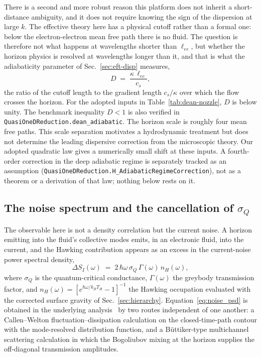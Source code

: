 \documentclass[aps,prd,reprint,nofootinbib,superscriptaddress]{revtex4-2}
\begin{document}
There is a second and more robust reason this platform does not inherit a
short-distance ambiguity, and it does not require knowing the sign of the
dispersion at large $k$. The effective theory here has a physical cutoff
rather than a formal one: below the electron-electron mean free path
there is no fluid. The question is therefore not what happens at
wavelengths shorter than $\ell_{ee}$, but whether the horizon physics is
resolved at wavelengths longer than it, and that is what the adiabaticity
parameter of Sec.~\ref{sec:eft-disp} measures,
\begin{equation}
D \;=\; \frac{\kappa\,\ell_{ee}}{c_s},
\label{eq:adiabaticity}
\end{equation}
the ratio of the cutoff length to the gradient length $c_s/\kappa$ over
which the flow crosses the horizon. For the adopted inputs in Table~\ref{tab:dean-nozzle}, $D$ is below
unity. The benchmark inequality $D < 1$ is also verified in
\texttt{QuasiOneDReduction.dean\_adiabatic}. The horizon scale is roughly four mean free paths. This scale separation
motivates a hydrodynamic treatment but does not determine the leading
dispersive correction from the microscopic theory. Our adopted quadratic
law gives a numerically small shift at these inputs. A fourth-order
correction in the deep adiabatic regime is separately tracked as an
assumption (\texttt{QuasiOneDReduction.H\_AdiabaticRegimeCorrection}),
not as a theorem or a derivation of that law; nothing below rests on it.

\subsection{The noise spectrum and the cancellation of $\sigma_Q$}
\label{sec:gr-noise}

The observable here is not a density correlation but the current noise. A
horizon emitting into the fluid's collective modes emits, in an
electronic fluid, into the current, and the Hawking contribution appears
as an excess in the current-noise power spectral density,
\begin{equation}
\Delta S_I(\omega) \;=\; 2\,\hbar\omega\,\sigma_Q\,\Gamma(\omega)\,
n_H(\omega),
\label{eq:noise_psd}
\end{equation}
where $\sigma_Q$ is the quantum-critical conductance, $\Gamma(\omega)$
the greybody transmission factor, and
$n_H(\omega) = [e^{\hbar\omega/k_B T_H} - 1]^{-1}$ the Hawking
occupation evaluated with the corrected surface gravity of
Sec.~\ref{sec:hierarchy}. Equation~\eqref{eq:noise_psd} is obtained in
the underlying analysis~\cite{Roehm2026Wave16} by two routes independent
of one another: a Callen--Welton fluctuation--dissipation calculation on
the closed-time-path contour with the mode-resolved distribution
function, and a B\"uttiker-type multichannel scattering calculation in
which the Bogoliubov mixing at the horizon supplies the off-diagonal
transmission amplitudes.
\end{document}
